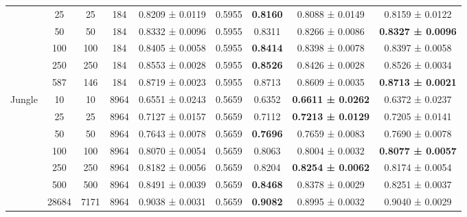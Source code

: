 \begin{table}
{\begin{tabular}[H]{@{}lcccccccc@{}}
                              & 25    & 25   & 184  & 0.8209 ± 0.0119      & 0.5955               & \textbf{0.8160} & 0.8088 ± 0.0149          & 0.8159 ± 0.0122          \\
                              & 50    & 50   & 184  & 0.8332 ± 0.0096      & 0.5955               & 0.8311          & 0.8266 ± 0.0086          & \textbf{0.8327 ± 0.0096} \\
                              & 100   & 100  & 184  & 0.8405 ± 0.0058      & 0.5955               & \textbf{0.8414} & 0.8398 ± 0.0078          & 0.8397 ± 0.0058          \\
                              & 250   & 250  & 184  & 0.8553 ± 0.0028      & 0.5955               & \textbf{0.8526} & 0.8426 ± 0.0028          & 0.8526 ± 0.0034          \\
                              & 587   & 146  & 184  & 0.8719 ± 0.0023      & 0.5955               & 0.8713          & 0.8609 ± 0.0035          & \textbf{0.8713 ± 0.0021} \\
                              \midrule
\multirow{7}{*}{Jungle}       & 10    & 10   & 8964 & 0.6551 ± 0.0243      & 0.5659               & 0.6352          & \textbf{0.6611 ± 0.0262} & 0.6372 ± 0.0237          \\
                              & 25    & 25   & 8964 & 0.7127 ± 0.0157      & 0.5659               & 0.7112          & \textbf{0.7213 ± 0.0129} & 0.7205 ± 0.0141          \\
                              & 50    & 50   & 8964 & 0.7643 ± 0.0078      & 0.5659               & \textbf{0.7696} & 0.7659 ± 0.0083          & 0.7690 ± 0.0078          \\
                              & 100   & 100  & 8964 & 0.8070 ± 0.0054      & 0.5659               & 0.8063          & 0.8004 ± 0.0032          & \textbf{0.8077 ± 0.0057} \\
                              & 250   & 250  & 8964 & 0.8182 ± 0.0056      & 0.5659               & 0.8204          & \textbf{0.8254 ± 0.0062} & 0.8174 ± 0.0054          \\
                              & 500   & 500  & 8964 & 0.8491 ± 0.0039      & 0.5659               & \textbf{0.8468} & 0.8378 ± 0.0029          & 0.8251 ± 0.0037          \\
                              & 28684 & 7171 & 8964 & 0.9038 ± 0.0031      & 0.5659               & \textbf{0.9082} & 0.8995 ± 0.0032          & 0.9040 ± 0.0029 \\     

\bottomrule
\end{tabular}}
\end{table}



